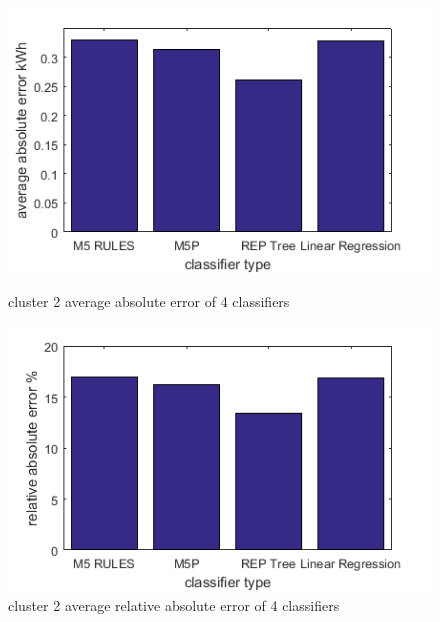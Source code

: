 \begin{figure}

\centering
\begin{minipage}{.5\textwidth}
  \centering
  \includegraphics[width=\linewidth]{cluster-2-diff-classifier-avg-abs.png}
  \caption{cluster 2 average absolute error of 4 classifiers}
  \label{fig:cluster-2-predictors}
\end{minipage}%
\begin{minipage}{.5\textwidth}
  \centering
  \includegraphics[width=\linewidth]{cluster-2-diff-classifier-relative-abs.png}
  \caption{cluster 2 average relative absolute error of 4 classifiers}
\end{minipage}


\end{figure}
